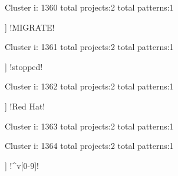 Cluster i: 1360
total projects:2
total patterns:1
\begin{multicols}{1}
\begin{description}[noitemsep,topsep=0pt]
\item [[2] ] \cverb!MIGRATE!
\end{description}
\end{multicols}







Cluster i: 1361
total projects:2
total patterns:1
\begin{multicols}{1}
\begin{description}[noitemsep,topsep=0pt]
\item [[2] ] \cverb!stopped!
\end{description}
\end{multicols}







Cluster i: 1362
total projects:2
total patterns:1
\begin{multicols}{1}
\begin{description}[noitemsep,topsep=0pt]
\item [[2] ] \cverb!Red Hat!
\end{description}
\end{multicols}







Cluster i: 1363
total projects:2
total patterns:1
\begin{multicols}{1}
\end{multicols}







Cluster i: 1364
total projects:2
total patterns:1
\begin{multicols}{1}
\begin{description}[noitemsep,topsep=0pt]
\item [[2] ] \cverb!^v[0-9]!
\end{description}
\end{multicols}







